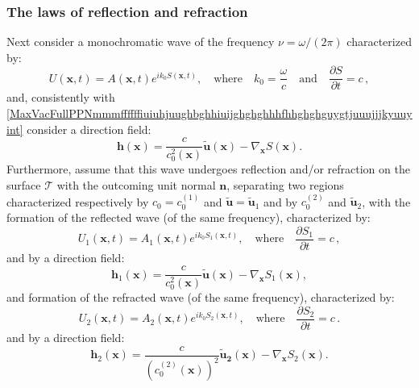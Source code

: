 \documentclass{article}
\theoremstyle{definition}
\theoremstyle{remark}
\renewcommand{\vec}[1]{\mathbf{#1}}
\newcommand{\er}{\eqref}
\newcommand{\er}{\eqref}
\begin{document}
\subsubsection{The laws of reflection and refraction}
Next consider a monochromatic wave of the frequency
$\nu=\omega/(2\pi)$ characterized by:
\begin{equation}\label{MaxVacFullPPNmmmffffffiuiuhjuughbghhuiiujjhhjjhjhhjint}
U(\vec x,t)=A(\vec x,t)e^{ik_0S(\vec x,t)},\quad\text{where}\quad
k_0=\frac{\omega}{c}\quad\text{and}\quad\frac{\partial S}{\partial
t}=c\,,
\end{equation}
and, consistently with
\er{MaxVacFullPPNmmmffffffiuiuhjuughbghhiuijghghghhhfhhghghguygtjuuujjjkyuuyint}
consider a direction field:
\begin{equation}\label{MaxVacFullPPNmmmffffffiuiuhjuughbghhiuijghghghhhfhhghghguygtjuuujjjkyuuykjkjjint}
\vec h(\vec x)=\frac{c}{c^2_0(\vec x)}\vec {\tilde u}(\vec
x)-\nabla_{\vec x}S(\vec x).
\end{equation}
Furthermore, assume that this wave undergoes reflection and/or
refraction on the surface $\mathcal{T}$ with the outcoming unit
normal $\vec n$, separating two regions characterized respectively
by $c_0=c^{(1)}_0$ and $\vec {\tilde u}=\vec {\tilde u}_1$ and by
$c^{(2)}_0$ and $\vec {\tilde u}_2$, with the formation of the
reflected wave (of the same frequency), characterized by:
\begin{equation}\label{MaxVacFullPPNmmmffffffiuiuhjuughbghhuiiujjhhjjhjhhjughint}
U_1(\vec x,t)=A_1(\vec x,t)e^{ik_0S_1(\vec
x,t)},\quad\text{where}\quad\frac{\partial S_1}{\partial t}=c\,,
\end{equation}
and by a direction field:
\begin{equation}\label{MaxVacFullPPNmmmffffffiuiuhjuughbghhiuijghghghhhfhhghghguygtjuuujjjkyuuykjkjjhjhhjint}
\vec h_1(\vec x)=\frac{c}{c^2_0(\vec x)}\vec {\tilde u}(\vec
x)-\nabla_{\vec x}S_1(\vec x),
\end{equation}
and formation of the refracted wave (of the same frequency),
characterized by:
\begin{equation}\label{MaxVacFullPPNmmmffffffiuiuhjuughbghhuiiujjhhjjhjhhj1int}
U_2(\vec x,t)=A_2(\vec x,t)e^{ik_0S_2(\vec
x,t)},\quad\text{where}\quad\frac{\partial S_2}{\partial t}=c\,.
\end{equation}
and by a direction field:
\begin{equation}\label{MaxVacFullPPNmmmffffffiuiuhjuughbghhiuijghghghhhfhhghghguygtjuuujjjkyuuykjkjj1int}
\vec h_2(\vec x)=\frac{c}{\left(c^{(2)}_0(\vec x)\right)^2}\vec
{\tilde u_2}(\vec x)-\nabla_{\vec x}S_2(\vec x).
\end{equation}
\end{document}
